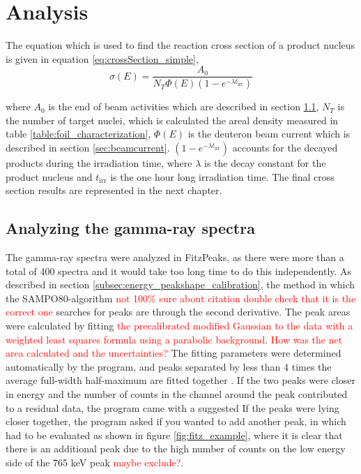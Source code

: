 \chapter{Analysis}\label{chapter:analysis} %

The equation which is used to find the reaction cross section of a product nucleus is given in equation \ref{eq:crossSection_simple},
$$\sigma(E)=\frac{A_0}{N_T \Phi(E)(1-e^{-\lambda t_\text{irr}})}$$

where $A_0$ is the end of beam activities which are described in section \ref{sec:EOB_A0},  $N_T$ is the number of target nuclei, which is calculated the areal density measured in table \ref{table:foil_characterization}, $\Phi(E)$ is the deuteron beam current which is described in section \ref{sec:beamcurrent}. $(1-e^{-\lambda t_\text{irr}})$ accounts for the decayed products during the irradiation time, where $\lambda$ is the decay constant for the product nucleus and $t_\text{irr}$ is the one hour long irradiation time.  The final cross section results are represented in the next chapter. 

\section{Analyzing the gamma-ray spectra} \label{sec:EOB_A0} 


\noindent 
The gamma-ray spectra were analyzed in FitzPeaks\cite{Fitzgerald2009}, as there were more than a total of 400 spectra and it would take too long time to do this independently. As described in section \ref{subsec:energy_peakshape_calibration}, the method in which the SAMPO80-algorithm \cite{Koskelo1981} \textcolor{red}{not 100\% sure about citation double check that it is the correct one} searches for peaks are through the second derivative. The peak areas were calculated by fitting \textcolor{red}{the precalibrated modified Gaussian to the data with a weighted least squares formula using a parabolic background}. \textcolor{red}{How was the net area calculated and the uncertainties?} The fitting parameters were determined automatically by the program, and peaks separated by less than 4 times the average full-width half-maximum are fitted together \cite{Koskelo1981}. If the two peaks were closer in energy and the number of counts in the channel around the peak contributed to a residual data, the program came with a suggested 
If the peaks were lying closer together, the program asked if you wanted to add another peak, in which had to be evaluated as shown in figure \ref{fig:fitz_example}, where it is clear that there is an additional peak due to the high number of counts on the low energy side of the 765 keV peak \textcolor{red}{maybe exclude?}. 

